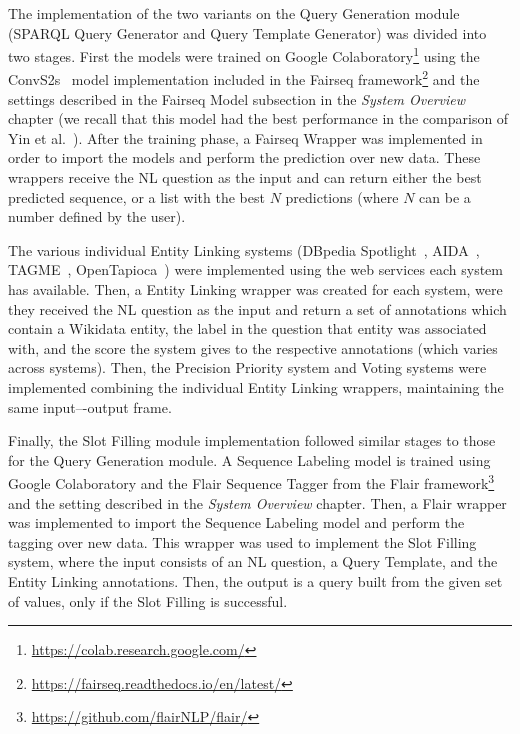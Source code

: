 The implementation of the two variants on the Query Generation module (SPARQL Query Generator 
and Query Template Generator) was divided into two stages. First the models were trained on 
Google Colaboratory\footnote{\url{https://colab.research.google.com/}} using the 
ConvS2s~\cite{nmt:convS2S-GehringAGYD17} model implementation included in the Fairseq 
framework\footnote{\url{https://fairseq.readthedocs.io/en/latest/}} and the settings described in the 
Fairseq Model subsection in the \textit{System Overview} chapter (we recall that this model had 
the best performance in the comparison of Yin et al.~\cite{nmt:nl-to-sparql-Yin19}). After the 
training phase, a Fairseq Wrapper was implemented in order to import the models and perform the 
prediction over new data. These wrappers receive the NL question as the input and can return 
either the best predicted sequence, or a list with the best $N$ predictions (where $N$ can be a 
number defined by the user).

The various individual Entity Linking systems (DBpedia Spotlight~\cite{EL:dbpedia-spotlight-MendesJGB11}, 
AIDA~\cite{EL:aida-tool-YosefHBSW11, EL:aida-HoffartYBFPSTTW11}, TAGME~\cite{EL:tagme-FerraginaS10}, 
OpenTapioca~\cite{EL:opentapioca-Delpeuch19}) were implemented using the web services each system 
has available. Then, a Entity Linking wrapper was created for each system, were they received the 
NL question as the input and return a set of annotations which contain a Wikidata entity, the 
label in the question that entity was associated with, and the score the system gives to the 
respective annotations (which varies across systems). Then, the Precision Priority system and 
Voting systems were implemented combining the individual Entity Linking wrappers, maintaining 
the same input–-output frame.

Finally, the Slot Filling module implementation followed similar stages to those for the Query 
Generation module. A Sequence Labeling model is trained using Google Colaboratory and the Flair 
Sequence Tagger from the Flair framework\footnote{\url{https://github.com/flairNLP/flair/}} and 
the setting described in the \textit{System Overview} chapter. Then, a Flair wrapper was 
implemented to import the Sequence Labeling model and perform the tagging over new data. This 
wrapper was used to implement the Slot Filling system, where the input consists of an NL question, 
a Query Template, and the Entity Linking annotations. Then, the output is a \SPARQL{} query built 
from the given set of values, only if the Slot Filling is successful.

